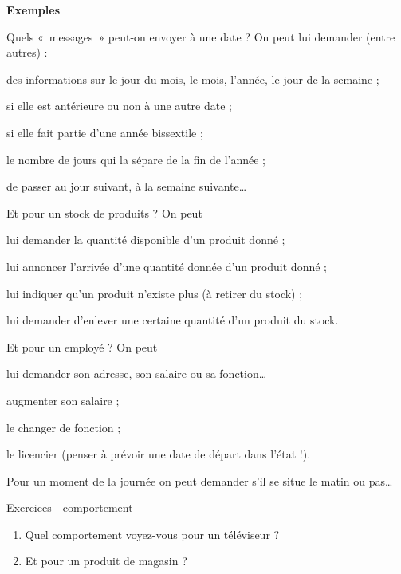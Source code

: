 		\textbf{Exemples}
		\begin{liste}
		\item
			Quels «~messages~» peut-on envoyer à une date ? 
			On peut lui demander (entre autres) :
			\begin{liste}
			\item
				des informations sur le jour du mois, le mois, l'année,
				le jour de la semaine ;
			\item
				si elle est antérieure ou non à une autre date ;
			\item
				si elle fait partie d'une année bissextile ;
			\item
				le nombre de jours qui la sépare de la fin de l'année ;
			\item 
				de passer au jour suivant, à la semaine suivante\dots
			\end{liste}
		\item 
			Et pour un stock de produits ? On peut 
			\begin{liste}
			\item
				lui demander la quantité disponible d'un produit donné ;
			\item
				lui annoncer l'arrivée d'une quantité
				donnée d'un produit donné ;
			\item
				lui indiquer qu'un produit n'existe
				plus (à retirer du stock) ;
			\item 
				lui demander d'enlever une certaine quantité
				d'un produit du stock.
			\end{liste}
		\item
			Et pour un employé ? On peut
			\begin{liste}
			\item 
				lui demander son adresse, son salaire ou sa fonction\dots
			\item 
				augmenter son salaire ;
			\item 
				le changer de fonction ;
			\item 
				le licencier 
				(penser à prévoir une date de départ dans l'état !).
			\end{liste}
		\item 
			Pour un moment de la journée on peut demander s'il se
			situe le matin ou pas\dots	
		\end{liste}

		\begin{Emphase}{Exercices - comportement}
			\remonter
			\begin{enumerate}
			\item
				Quel comportement voyez-vous pour un téléviseur ?
			\item
				Et pour un produit de magasin ?
			\end{enumerate}
		\end{Emphase}

